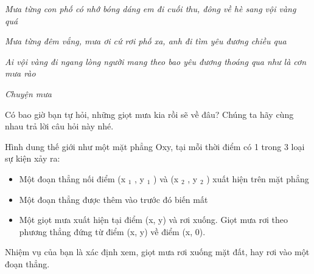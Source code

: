 \emph{Mưa từng con phố có nhớ bóng dáng em đi cuối thu, đông về hè sang vội vàng quá }

\emph{Mưa từng đêm vắng, mưa ơi cứ rơi phố xa, anh đi tìm yêu đương chiều qua }

\emph{Ai vội vàng đi ngang lòng người mang theo bao yêu đương thoáng qua như là cơn mưa rào }

\emph{Chuyện mưa }

Có bao giờ bạn tự hỏi, những giọt mưa kia rồi sẽ về đâu? Chúng ta hãy cùng nhau trả lời câu hỏi này nhé.

Hình dung thế giới như một mặt phẳng Oxy, tại mỗi thời điểm có 1 trong 3 loại sự kiện xảy ra:
\begin{itemize}
	\item Một đoạn thẳng nối điểm (x $_ 1 $ , y $_ 1 $ ) và (x $_ 2 $ , y $_ 2 $ ) xuất hiện trên mặt phẳng
	\item Một đoạn thẳng được thêm vào trước đó biến mất
	\item Một giọt mưa xuất hiện tại điểm (x, y) và rơi xuống. Giọt mưa rơi theo phương thẳng đứng từ điểm (x, y) về điểm (x, 0).
\end{itemize}

Nhiệm vụ của bạn là xác định xem, giọt mưa rơi xuống mặt đất, hay rơi vào một đoạn thẳng.